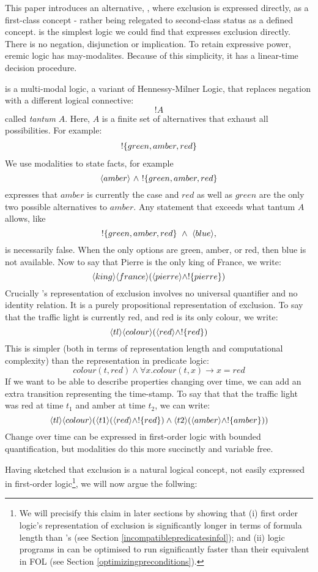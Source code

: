 This paper introduces an alternative, \ELFULL{}, where exclusion is
expressed directly, as a first-class concept - rather being relegated
to second-class status as a defined concept. \ELFULL{} is the simplest
logic we could find that expresses exclusion directly.  There is no
negation, disjunction or implication. To retain expressive power,
eremic logic has may-modalites.  Because of this simplicity, it has a
linear-time decision procedure.

\ELFULL{} is a multi-modal logic, a variant of Hennessy-Milner Logic,
that replaces negation with a different logical connective:
\[
   !A
\]
called \emph{tantum} $A$. Here, $A$ is a finite set of alternatives
that exhaust all possibilities.  For example:
\begin{eqnarray*}
! \{green, amber, red\}
\end{eqnarray*}
We use modalities to state  facts, for example
\[
   \langle amber \rangle\ \land\ !\{green, amber, red\} 
\]
expresses that $amber$ is currently the case and $red$ as well as
$green$ are the only two possible alternatives to $amber$.  Any
statement that exceeds what tantum $A$ allows, like
\[
   !\{green, amber, red\}\ \AND\ \MAY{blue},
\]
is necessarily false.  When the only options are green, amber, or red,
then blue is not available.  Now to say that Pierre is the only king
of France, we write:
\[
\langle king \rangle \langle france \rangle (\langle pierre \rangle \land ! \{pierre\})
\]
Crucially \ELFULL{}'s representation of exclusion involves no
universal quantifier and no identity relation.  It is a purely
propositional representation of exclusion.  To say that the traffic
light is currently red, and red is its only colour, we write:
\[
\langle tl \rangle \langle colour \rangle (\langle red \rangle \land !\{red\})
\]
This is simpler (both in terms of representation length and
computational complexity) than the representation in predicate logic:
\[
colour(t, red) \land \forall x . colour(t, x) \rightarrow x = red
\]
If we want to be able to describe properties changing over time, we
can add an extra transition representing the time-stamp.  To say that
that the traffic light was red at time $t_1$ and amber at time $t_2$,
we can write:
\[
   \langle tl \rangle \langle colour \rangle (\langle t1 \rangle (\langle red \rangle \land !\{red\}) \land \langle t2 \rangle (\langle amber \rangle \land !\{amber\}))
\]
Change over time can be expressed in first-order logic with bounded
quantification, but modalities do this more succinctly and variable
free.

Having sketched that exclusion is a natural logical concept, not
easily expressed in first-order logic\footnote{We will precisify this
  claim in later sections by showing that (i) first order logic's
  representation of exclusion is significantly longer in terms of
  formula length than \ELFULL{}'s (see Section
  \ref{incompatiblepredicatesinfol}); and (ii) logic programs in
  \ELFULL{} can be optimised to run significantly faster than their
  equivalent in FOL (see Section \ref{optimizingpreconditions}).},  we
will now argue the follwing:

